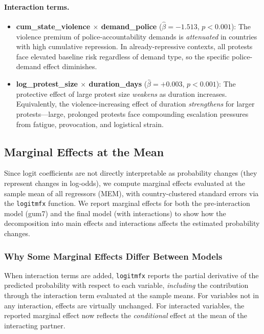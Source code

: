 \documentclass[12pt,a4paper]{article}
\begin{document}
\paragraph{Interaction terms.}
\begin{itemize}
  \item \textbf{cum\_state\_violence $\times$ demand\_police} ($\hat{\beta} = -1.513$, $p < 0.001$): The violence premium of police-accountability demands is \emph{attenuated} in countries with high cumulative repression. In already-repressive contexts, all protests face elevated baseline risk regardless of demand type, so the specific police-demand effect diminishes.
  \item \textbf{log\_protest\_size $\times$ duration\_days} ($\hat{\beta} = +0.003$, $p < 0.001$): The protective effect of large protest size \emph{weakens} as duration increases. Equivalently, the violence-increasing effect of duration \emph{strengthens} for larger protests---large, prolonged protests face compounding escalation pressures from fatigue, provocation, and logistical strain.
\end{itemize}

\subsection{Marginal Effects at the Mean}
\label{sec:mfx}

Since logit coefficients are not directly interpretable as probability changes (they represent changes in log-odds), we compute marginal effects evaluated at the sample mean of all regressors (MEM), with country-clustered standard errors via the \texttt{logitmfx} function. We report marginal effects for both the pre-interaction model (gum7) and the final model (with interactions) to show how the decomposition into main effects and interactions affects the estimated probability changes.

\subsubsection{Why Some Marginal Effects Differ Between Models}

When interaction terms are added, \texttt{logitmfx} reports the partial derivative of the predicted probability with respect to each variable, \emph{including} the contribution through the interaction term evaluated at the sample means. For variables not in any interaction, effects are virtually unchanged. For interacted variables, the reported marginal effect now reflects the \emph{conditional} effect at the mean of the interacting partner.
\end{document}

